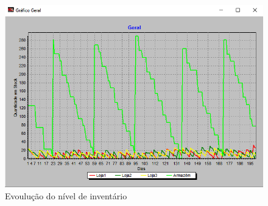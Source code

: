 \begin{figure}[<+htpb+>]
	\centering
	\includegraphics[scale=0.75]{./report-TP2/img/geral_total.png}
	\caption{Evoulução do nível de inventário}
\label{fig:figure5}
\end{figure}
